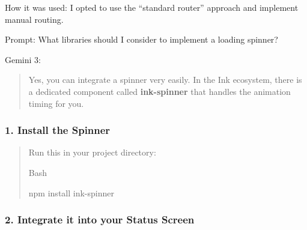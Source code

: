 How it was used: I opted to use the ``standard router'' approach and
implement manual routing.

Prompt: What libraries should I consider to implement a loading spinner?

Gemini 3:

\begin{quote}
Yes, you can integrate a spinner very easily. In the Ink ecosystem,
there is a dedicated component called \textbf{ink-spinner} that handles
the animation timing for you.
\end{quote}

\hypertarget{install-the-spinner}{%
\subsubsection{\texorpdfstring{\textbf{1. Install the
Spinner}}{1. Install the Spinner}}\label{install-the-spinner}}

\begin{quote}
Run this in your project directory:

Bash

npm install ink-spinner
\end{quote}

\hypertarget{integrate-it-into-your-status-screen}{%
\subsubsection{\texorpdfstring{\textbf{2. Integrate it into your Status
Screen}}{2. Integrate it into your Status Screen}}\label{integrate-it-into-your-status-screen}}

